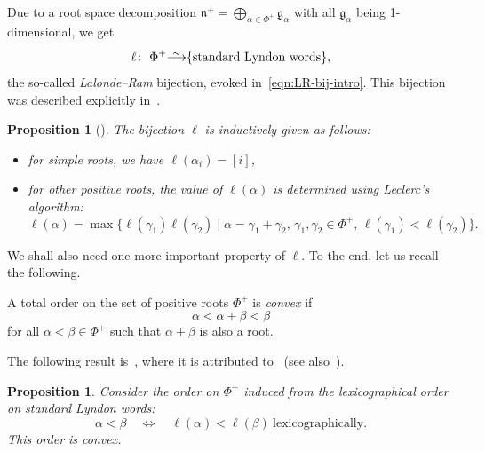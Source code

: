\documentclass[pdftex]{sigma}
\numberwithin{equation}{section}
\newtheorem{Proposition}[Theorem]{Proposition}
 { \theoremstyle{definition}
\newtheorem{Definition}[Theorem]{Definition}
\newtheorem{Note}[Theorem]{Note}
\newtheorem{Example}[Theorem]{Example}
\newtheorem{Remark}[Theorem]{Remark} }
\newcommand{\fg}{\mathfrak{g}}
\newcommand{\fn}{\mathfrak{n}}
\newcommand{\slaws}{\text{standard Lyndon words}}
\newcommand\iso{ \vphantom{j^{X^2}}\smash{\overset{\sim}{\vphantom{\rule{0pt}{0.20em}}\smash{\longrightarrow}}} }
\begin{document}
Due to a root space decomposition $\fn^+=\bigoplus_{\alpha\in \Phi^+} \fg_\alpha$ with all $\fg_\alpha$ being 1-dimensional, we get
\begin{displaymath}
 \ell \colon\ \Phi^+ \iso \{\slaws \},
\end{displaymath}
the so-called \emph{Lalonde--Ram} bijection, evoked in~\eqref{eqn:LR-bij-intro}. This bijection was described explicitly in~\cite{L}.

\begin{Proposition}[{\cite[Proposition~25]{L}}]\label{prop:Leclerc algorithm}
The bijection $\ell$ is inductively given as follows:
\begin{itemize}\itemsep=0pt
\item[$\bullet$]
for simple roots, we have $\ell(\alpha_i)=[i]$,

\item[$\bullet$]
for other positive roots, the value of $\ell(\alpha)$ is determined using Leclerc's algorithm:
\begin{equation*}%
 \ell(\alpha) =
 \max\{ \ell(\gamma_1)\ell(\gamma_2) \mid
 \alpha=\gamma_1+\gamma_2 ,\, \gamma_1,\gamma_2\in \Phi^+ ,\, \ell(\gamma_1) < \ell(\gamma_2) \}.
\end{equation*}
\end{itemize}
\end{Proposition}

We shall also need one more important property of $\ell$. To the end, let us recall the following.

\begin{Definition}\label{def:convex}
A total order on the set of positive roots $\Phi^+$ is \textit{convex} if
\begin{displaymath}
 \alpha < \alpha+\beta < \beta
\end{displaymath}
for all $\alpha < \beta \in \Phi^+$ such that $\alpha+\beta$ is also a root.
\end{Definition}


The following result is~\cite[Proposition~28]{L}, where it is attributed to~\cite{Ro}
(see also~\cite[Proposition~2.34]{NT}).

\begin{Proposition}\label{prop:fin.convex}
Consider the order on $\Phi^+$ induced from the lexicographical order on standard Lyndon words:
\begin{equation}\label{eqn:induces}
 \alpha < \beta \quad \Longleftrightarrow \quad \ell(\alpha) < \ell(\beta) \ \mathrm{lexicographically}.
\end{equation}
This order is convex.
\end{Proposition}
\end{document}
